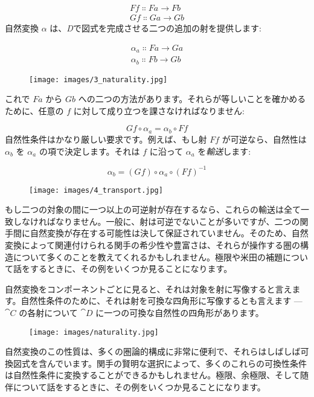 \begin{gather*}
  F f \Colon F a \to F b \\
  G f \Colon G a \to G b
\end{gather*}
自然変換 $\alpha$ は、\emph{D}で図式を完成させる二つの追加の射を提供します: 

\begin{gather*}
  \alpha_a \Colon F a \to G a \\
  \alpha_b \Colon F b \to G b
\end{gather*}

\begin{figure}[H]
  \centering
  \texttt{[image: images/3\_naturality.jpg]}
\end{figure}

\noindent
これで $F a$ から $G b$ への二つの方法があります。それらが等しいことを確かめるために、任意の $f$ に対して成り立つを課さなければなりません: 

\[G f \circ \alpha_a = \alpha_b \circ F f\]
自然性条件はかなり厳しい要求です。例えば、もし射 $F f$ が可逆なら、自然性は $\alpha_b$ を $\alpha_a$ の項で決定します。それは $f$ に沿って $\alpha_a$ を\emph{輸送}します: 

\[\alpha_b = (G f) \circ \alpha_a \circ (F f)^{-1}\]

\begin{figure}[H]
  \centering
  \texttt{[image: images/4\_transport.jpg]}
\end{figure}

\noindent
もし二つの対象の間に一つ以上の可逆射が存在するなら、これらの輸送は全て一致しなければなりません。一般に、射は可逆でないことが多いですが、二つの関手間に自然変換が存在する可能性は決して保証されていません。そのため、自然変換によって関連付けられる関手の希少性や豊富さは、それらが操作する圏の構造について多くのことを教えてくれるかもしれません。極限や米田の補題について話をするときに、その例をいくつか見ることになります。

自然変換をコンポーネントごとに見ると、それは対象を射に写像すると言えます。自然性条件のために、それは射を可換な四角形に写像するとも言えます --- $\cat{C}$ の各射について $\cat{D}$ に一つの可換な自然性の四角形があります。

\begin{figure}[H]
  \centering
  \texttt{[image: images/naturality.jpg]}
\end{figure}

\noindent
自然変換のこの性質は、多くの圏論的構成に非常に便利で、それらはしばしば可換図式を含んでいます。関手の賢明な選択によって、多くのこれらの可換性条件は自然性条件に変換することができるかもしれません。極限、余極限、そして随伴について話をするときに、その例をいくつか見ることになります。

